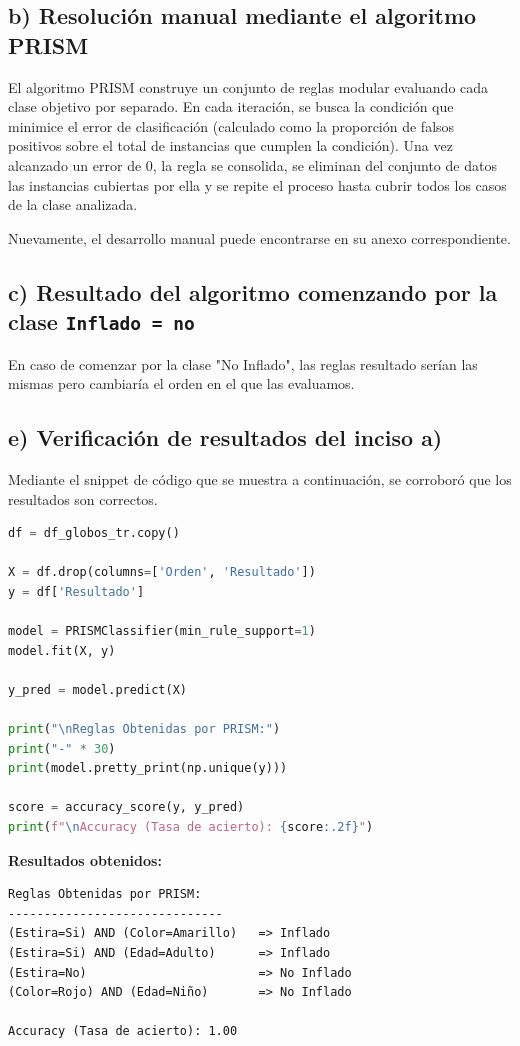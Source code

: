 \documentclass{article}
\begin{document}
\subsection*{b) Resolución manual mediante el algoritmo PRISM}

El algoritmo PRISM construye un conjunto de reglas modular evaluando cada clase objetivo por separado. En cada iteración, se busca la condición que minimice el error de clasificación (calculado como la proporción de falsos positivos sobre el total de instancias que cumplen la condición). Una vez alcanzado un error de $0$, la regla se consolida, se eliminan del conjunto de datos las instancias cubiertas por ella y se repite el proceso hasta cubrir todos los casos de la clase analizada.

Nuevamente, el desarrollo manual puede encontrarse en su anexo correspondiente.

\subsection*{c) Resultado del algoritmo comenzando por la clase \texttt{Inflado = no}}

En caso de comenzar por la clase "No Inflado", las reglas resultado serían las mismas pero cambiaría el orden en el que las evaluamos. 

\subsection*{e) Verificación de resultados del inciso a)}

Mediante el snippet de código que se muestra a continuación, se corroboró que los resultados son correctos.

\begin{lstlisting}[language=Python]
df = df_globos_tr.copy()

X = df.drop(columns=['Orden', 'Resultado'])
y = df['Resultado']

model = PRISMClassifier(min_rule_support=1)
model.fit(X, y)

y_pred = model.predict(X)

print("\nReglas Obtenidas por PRISM:")
print("-" * 30)
print(model.pretty_print(np.unique(y)))

score = accuracy_score(y, y_pred)
print(f"\nAccuracy (Tasa de acierto): {score:.2f}")
\end{lstlisting}

\textbf{Resultados obtenidos:}
\begin{verbatim}
Reglas Obtenidas por PRISM:
------------------------------
(Estira=Si) AND (Color=Amarillo)   => Inflado
(Estira=Si) AND (Edad=Adulto)      => Inflado
(Estira=No)                        => No Inflado
(Color=Rojo) AND (Edad=Niño)       => No Inflado

Accuracy (Tasa de acierto): 1.00
\end{verbatim}
\end{document}
